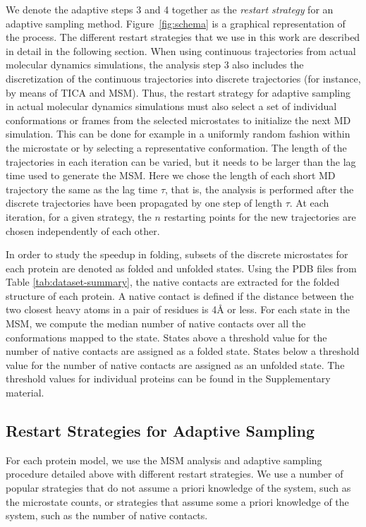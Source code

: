 We denote the adaptive steps 3 and 4 together as the \emph{restart strategy} for an
adaptive sampling method. Figure~\ref{fig:schema} is a graphical representation
of the process. The different restart strategies that we use in this work are
described in detail in the following section. When using continuous trajectories from actual molecular dynamics simulations,
the analysis step 3 also includes the discretization of the continuous
trajectories into discrete trajectories (for instance, by means of TICA and MSM).
Thus, the restart strategy for adaptive sampling in actual molecular dynamics
simulations must also select a set of individual conformations or frames from the selected
microstates to initialize the next MD simulation. This can be done for example in
a uniformly random fashion within the microstate or by selecting a representative
conformation. 
The length of the trajectories in each iteration can be varied, but it needs to
be larger than the lag time used to generate the MSM.
Here we chose the length of each short MD trajectory the same as the lag time
$\tau$, that is, the analysis is performed after the discrete trajectories have
been propagated by one step of length $\tau$. 
At each iteration, for a given strategy, the $n$ restarting points for the new
trajectories are chosen independently of each other.

In order to study the speedup in folding, subsets of the discrete microstates for
each protein are denoted as folded and unfolded states. 
Using the PDB files from Table \ref{tab:dataset-summary}, the native contacts
are extracted for the folded structure of each protein. A native contact is
defined if the distance between the two closest heavy atoms in a pair of
residues is 4\r{A} or less. For each state in the MSM, we compute the median number of native
contacts over all the conformations mapped to the state. States above a threshold
value for the number of native contacts are assigned as a folded state. States
below a threshold value for the number of native contacts are assigned as an
unfolded state. The threshold values for individual proteins can be found in the Supplementary material. 

\subsection{\label{sec:restart-strategies}Restart Strategies for Adaptive Sampling}

For each protein model, we use the MSM analysis and adaptive sampling procedure detailed
above with different restart strategies. We use a number of popular
strategies that do not assume a priori knowledge of the system, such as the microstate counts, or strategies that assume some a
priori knowledge of the system, such as the number of native contacts. 


